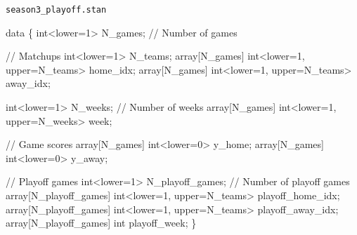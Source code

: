\documentclass[
  letterpaper,
  DIV=11,
  numbers=noendperiod]{scrartcl}
\newenvironment{Shaded}{\begin{snugshade}}{\end{snugshade}}
\newcommand{\CommentTok}[1]{\textcolor[rgb]{0.37,0.37,0.37}{#1}}
\newcommand{\DataTypeTok}[1]{\textcolor[rgb]{0.68,0.00,0.00}{#1}}
\newcommand{\DecValTok}[1]{\textcolor[rgb]{0.68,0.00,0.00}{#1}}
\newcommand{\KeywordTok}[1]{\textcolor[rgb]{0.00,0.23,0.31}{#1}}
\newcommand{\NormalTok}[1]{\textcolor[rgb]{0.00,0.23,0.31}{#1}}
\begin{document}
\begin{codelisting}

\caption{\texttt{season3\_playoff.stan}}

\begin{Shaded}
\begin{Highlighting}[]
\KeywordTok{data}\NormalTok{ \{}
  \DataTypeTok{int}\NormalTok{\textless{}}\KeywordTok{lower}\NormalTok{=}\DecValTok{1}\NormalTok{\textgreater{} N\_games; }\CommentTok{// Number of games}

  \CommentTok{// Matchups}
  \DataTypeTok{int}\NormalTok{\textless{}}\KeywordTok{lower}\NormalTok{=}\DecValTok{1}\NormalTok{\textgreater{} N\_teams;}
  \DataTypeTok{array}\NormalTok{[N\_games] }\DataTypeTok{int}\NormalTok{\textless{}}\KeywordTok{lower}\NormalTok{=}\DecValTok{1}\NormalTok{, }\KeywordTok{upper}\NormalTok{=N\_teams\textgreater{} home\_idx;}
  \DataTypeTok{array}\NormalTok{[N\_games] }\DataTypeTok{int}\NormalTok{\textless{}}\KeywordTok{lower}\NormalTok{=}\DecValTok{1}\NormalTok{, }\KeywordTok{upper}\NormalTok{=N\_teams\textgreater{} away\_idx;}

  \DataTypeTok{int}\NormalTok{\textless{}}\KeywordTok{lower}\NormalTok{=}\DecValTok{1}\NormalTok{\textgreater{} N\_weeks; }\CommentTok{// Number of weeks}
  \DataTypeTok{array}\NormalTok{[N\_games] }\DataTypeTok{int}\NormalTok{\textless{}}\KeywordTok{lower}\NormalTok{=}\DecValTok{1}\NormalTok{, }\KeywordTok{upper}\NormalTok{=N\_weeks\textgreater{} week;}

  \CommentTok{// Game scores}
  \DataTypeTok{array}\NormalTok{[N\_games] }\DataTypeTok{int}\NormalTok{\textless{}}\KeywordTok{lower}\NormalTok{=}\DecValTok{0}\NormalTok{\textgreater{} y\_home;}
  \DataTypeTok{array}\NormalTok{[N\_games] }\DataTypeTok{int}\NormalTok{\textless{}}\KeywordTok{lower}\NormalTok{=}\DecValTok{0}\NormalTok{\textgreater{} y\_away;}

  \CommentTok{// Playoff games}
  \DataTypeTok{int}\NormalTok{\textless{}}\KeywordTok{lower}\NormalTok{=}\DecValTok{1}\NormalTok{\textgreater{} N\_playoff\_games; }\CommentTok{// Number of playoff games}
  \DataTypeTok{array}\NormalTok{[N\_playoff\_games] }\DataTypeTok{int}\NormalTok{\textless{}}\KeywordTok{lower}\NormalTok{=}\DecValTok{1}\NormalTok{, }\KeywordTok{upper}\NormalTok{=N\_teams\textgreater{} playoff\_home\_idx;}
  \DataTypeTok{array}\NormalTok{[N\_playoff\_games] }\DataTypeTok{int}\NormalTok{\textless{}}\KeywordTok{lower}\NormalTok{=}\DecValTok{1}\NormalTok{, }\KeywordTok{upper}\NormalTok{=N\_teams\textgreater{} playoff\_away\_idx;}
  \DataTypeTok{array}\NormalTok{[N\_playoff\_games] }\DataTypeTok{int}\NormalTok{ playoff\_week;}
\NormalTok{\}}


\end{Highlighting}
\end{Shaded}
\end{codelisting}
\end{document}
